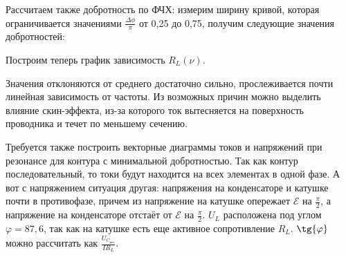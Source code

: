 \documentclass[a4paper, 12pt]{article}
\newcommand{\E}{\mathcal{E}}
\begin{document}
	Рассчитаем также добротность по ФЧХ: измерим ширину кривой, которая ограничивается значениями $\frac{\Delta \phi}{\pi}$ от 0,25 до 0,75, получим следующие значения добротностей:




	Построим теперь график зависимость $R_L(\nu)$.


	Значения отклоняются от среднего достаточно сильно, прослеживается почти линейная зависимость от частоты. Из возможных причин можно выделить влияние скин-эффекта, из-за которого ток вытесняется на поверхность проводника и течет по меньшему сечению.


	Требуется также построить векторные диаграммы токов и напряжений при резонансе для контура с минимальной добротностью. Так как контур последовательный, то токи будут находится на всех элементах в одной фазе. А вот с напряжением ситуация другая: напряжения на конденсаторе и катушке почти в противофазе, причем из напряжение на катушке опережает $\E$ на $\frac{\pi}{2}$, а напряжение на конденсаторе отстаёт от $\E$ на $\frac{\pi}{2}$.
	$U_L$ расположена под углом $\varphi = 87,6$\textdegree, так как на катушке есть еще активное сопротивление $R_L$. $\tg{\varphi}$ можно рассчитать как $\frac{U_{C_{\text{рез}}}}{IR_L}$.
\end{document}
